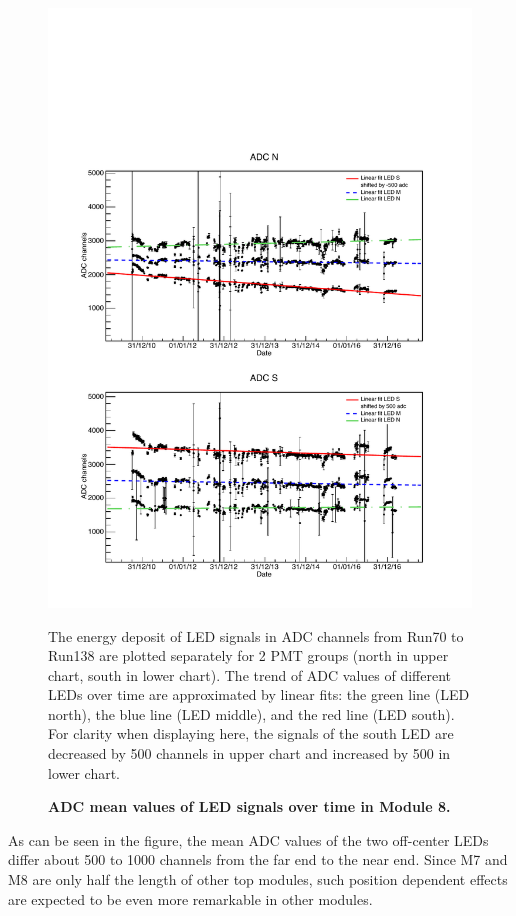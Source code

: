 \begin{figure}[htbp]
  \centering
  \includegraphics[width=\textwidth{}]{./fig/M8LED.pdf}
  \caption{\textbf{ADC mean values of LED signals over time in Module 8.}} The energy deposit of LED signals in ADC channels from Run70 to Run138 are plotted separately for 2 PMT groups (north in upper chart, south in lower chart). The trend of ADC values of different LEDs over time are approximated by linear fits: the green line (LED north), the blue line (LED middle), and the red line (LED south). For clarity when displaying here, the signals of the south LED are decreased by 500 channels in upper chart and increased by 500 in lower chart.
  \label{fig:M8LED}
\end{figure}

As can be seen in the figure, the mean ADC values of the two off-center LEDs differ about 500 to 1000 channels from the far end to the near end. Since M7 and M8 are only half the length of other top modules, such position dependent effects are expected to be even more remarkable in other modules.

